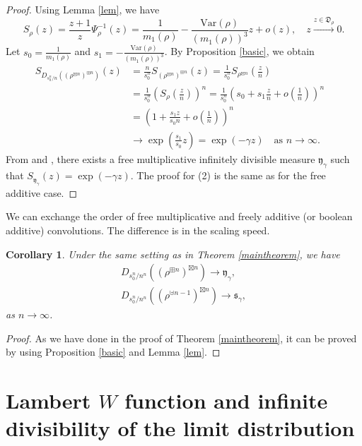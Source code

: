 \documentclass[12pt]{amsart}
\newtheorem{cor}[thm]{Corollary}
\theoremstyle{definition}
\numberwithin{equation}{section}
\begin{document}
\begin{proof}
Using Lemma \ref{lem}, we have
$$
S_{\rho}(z) = \frac{z+1}{z} \Psi^{-1}_{\rho}(z)=\frac{1}{m_1(\rho)}  - \frac{\mathrm{Var}(\rho)}{(m_1(\rho))^{3}} z+o(z),  \quad
z \overset{z\in \mathfrak{D}_{\rho}}{\longrightarrow} 0.
$$
Let $s_{0} = \frac{1}{m_1(\rho)}$ and $s_{1}=- \frac{\mathrm{Var}(\rho)}{(m_1(\rho))^{3}}$.
By Proposition \ref{basic}, we obtain
\begin{align*}
S_{D_{s_0^n/n}\left(\left(\rho^{\boxtimes n}\right)^{\boxplus n}\right)}(z) 
&=\frac{n}{s_{0}^{n}}S_{ (\rho^{\boxtimes n})^{\boxplus n}}(z)
=\frac{1}{s_{0}^{n}}S_{\rho^{\boxtimes n}}\left(\frac{z}{n}\right)&\\
&=\frac{1}{s_{0}^{n}}\left( S_{\rho}\left(\frac{z}{n}\right)\right)^{n}
=\frac{1}{s_{0}^{n}}\left(  s_{0} + s_{1}\frac{z}{n} +o\left(\frac{1}{n}\right)   \right)^{n}&\\
&=\left( 1 + \frac{s_1 z}{s_{0} n} + o\left(\frac{1}{n}\right) \right)^n &\\
&\to \exp\left(\frac{s_1}{s_0} z \right)= \exp\left(-\gamma  z \right)
\quad\text{as }n\to\infty.&
\end{align*} 
From \cite[Lemma 7.1]{BeVo92} and \cite[Theorem 6.13 (ii)]{BeVo93}, there exists a free multiplicative infinitely divisible measure $\mathfrak{y}_{\gamma}$ 
such that $S_{\mathfrak{y}_{\gamma}}(z) = \exp\left(-\gamma z \right)$.
The proof for (2) is the same as for the free additive case.
\end{proof}
We can exchange the order of free multiplicative and freely additive (or boolean additive)
convolutions. The difference is in the scaling speed.
\begin{cor}
Under the same setting as in Theorem \ref{maintheorem},
we have
\begin{align*}
&D_{s_0^n/n^{n}}\left(\left(\rho^{\boxplus n}\right)^{\boxtimes n}\right) 
\to \mathfrak{y}_{\gamma},&\\
&D_{s_0^n/n^{n}}\left(\left(\rho^{\uplus n-1}\right)^{\boxtimes n}\right) 
\to \mathfrak{s}_{\gamma},&
\end{align*}
as $n \to \infty$.
\end{cor}
\begin{proof}
As we have done in the proof of Theorem \ref{maintheorem},
it can be proved by using Proposition \ref{basic} and Lemma \ref{lem}.
\end{proof}
\section{Lambert $W$ function and infinite divisibility of the limit distribution}
\end{document}
